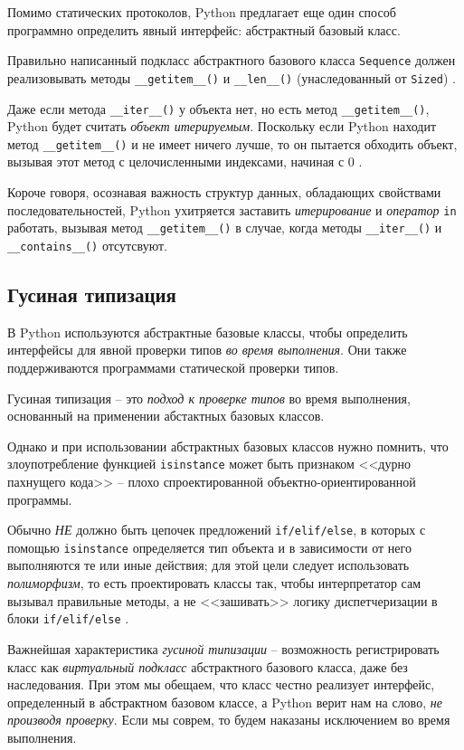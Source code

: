 \documentclass[%
	11pt,
	a4paper,
	utf8,
		]{article}
\begin{document}
Помимо статических протоколов, Python предлагает еще один способ программно определить явный интерфейс: абстрактный базовый класс.

Правильно написанный подкласс абстрактного базового класса \verb*|Sequence| должен реализовывать методы \verb*|__getitem__()| и \verb*|__len__()| (унаследованный от \verb*|Sized|) \cite[]{ramalho:python-2022}.

{\color{blue}Даже если метода \verb*|__iter__()| у объекта нет, но есть метод \verb*|__getitem__()|, Python будет считать \emph{объект итерируемым}. Поскольку если Python находит метод \verb*|__getitem__()| и не имеет ничего лучше, то он пытается обходить объект, вызывая этот метод с целочисленными индексами, начиная с 0} \cite[]{ramalho:python-2022}. 

Короче говоря, осознавая важность структур данных, обладающих свойствами последовательностей, Python ухитряется заставить \emph{итерирование} и \emph{оператор} \verb*|in| работать, вызывая метод \verb*|__getitem__()| в случае, когда методы \verb*|__iter__()| и \verb*|__contains__()| отсутсвуют.

\subsection{Гусиная типизация}

В Python используются абстрактные базовые классы, чтобы определить интерфейсы для явной проверки типов \emph{во время выполнения}. Они также поддерживаются программами статической проверки типов.

Гусиная типизация -- это \emph{подход к проверке типов} во время выполнения, основанный на применении абстактных базовых классов.

Однако и при использовании абстрактных базовых классов нужно помнить, что злоупотребление функцией \verb*|isinstance| может быть признаком <<дурно пахнущего кода>> -- плохо спроектированной объектно-ориентированной программы.

Обычно \emph{НЕ} должно быть цепочек предложений \verb*|if/elif/else|, в которых с помощью \verb*|isinstance| определяется тип объекта и в зависимости от него выполняются те или иные действия; для этой цели следует использовать \emph{полиморфизм}, то есть проектировать классы так, чтобы интерпретатор сам вызывал правильные методы, а не <<зашивать>> логику диспетчеризации в блоки \verb*|if/elif/else| \cite[]{ramalho:python-2022}.

{\color{blue}
Важнейшая характеристика \emph{гусиной типизации} -- возможность регистрировать класс как \emph{виртуальный подкласс} абстрактного базового класса, даже без наследования. При этом мы обещаем, что класс честно реализует интерфейс, определенный в абстрактном базовом классе, а Python верит нам на слово, \emph{\color{red}не производя проверку}. Если мы соврем, то будем наказаны исключением во время выполнения.
}
\end{document}
